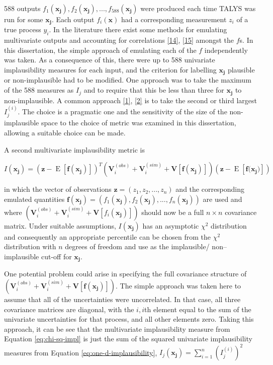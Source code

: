 \documentclass[
  12pt,
  a4paper,
  twoside]{book}
\DeclareMathOperator{\E}{E}
\begin{document}
588 outputs \(f_1(\mathbf{x_j}),f_2(\mathbf{x_j}),...,f_{588}(\mathbf{x_j})\) were produced each time TALYS was run for some \(\mathbf{x_j}\). Each output \(f_i(\mathbf{x})\) had a corresponding measurement \(z_i\) of a true process \(y_i\). In the literature there exist some methods for emulating multivariate outputs and accounting for correlations \protect\hyperlink{ref-jonty_efficient}{{[}14{]}}, \protect\hyperlink{ref-multivariate_gp}{{[}15{]}} amongst the \(f\)s. In this dissertation, the simple approach of emulating each of the \(f\) independently was taken. As a consequence of this, there were up to 588 univariate implausibility measures for each input, and the criterion for labelling \(\mathbf{x_j}\) plausible or non-implausible had to be modified. One approach was to take the maximum of the 588 measures as \(I_j\) and to require that this be less than three for \(\mathbf{x_j}\) to non-implausible. A common approach \protect\hyperlink{ref-jeremy_histmatch}{{[}1{]}}, \protect\hyperlink{ref-bower2010galaxy}{{[}2{]}} is to take the second or third largest \(I^{(i)}_j\). The choice is a pragmatic one and the sensitivity of the size of the non-implausible space to the choice of metric was examined in this dissertation, allowing a suitable choice can be made.

A second multivariate implausibility metric is

\begin{equation}
\label{eq:chi-sq-impl}
I(\mathbf{x_j}) = (\mathbf{z} - \E[\mathbf{f(x_j)}])^T\left(\mathbf{V}_i^{(obs)} + \mathbf{V}_i^{(sim)} + \mathbf{V}[\mathbf{f(x_j)}]\right)(\mathbf{z} - \E[\mathbf{f(x_j})])
\end{equation}

in which the vector of observations \(\mathbf{z} = (z_1,z_2,...,z_n)\) and the corresponding emulated quantities \(\mathbf{f(x_j)} = (f_1(\mathbf{x_j}),f_2(\mathbf{x_j}),...,f_n(\mathbf{x_j}))\) are used and where \(\left(\mathbf{V}_i^{(obs)} + \mathbf{V}_i^{(sim)} + \mathbf{V}[f_i(\mathbf{x_j})]\right)\) should now be a full \(n \times n\) covariance matrix. Under suitable assumptions, \(I(\mathbf{x_j})\) has an asymptotic \(\chi^2\) distribution and consequently an appropriate percentile can be chosen from the \(\chi^2\) distribution with \(n\) degrees of freedom and use as the implausible/ non--implausible cut-off for \(\mathbf{x_j}\).

One potential problem could arise in specifying the full covariance structure of \(\left(\mathbf{V}_i^{(obs)} + \mathbf{V}_i^{(sim)} + \mathbf{V}[\mathbf{f(x_j)}]\right)\). The simple approach was taken here to assume that all of the uncertainties were uncorrelated. In that case, all three covariance matrices are diagonal, with the \(i,i\)th element equal to the sum of the univariate uncertainties for that process, and all other elements zero. Taking this approach, it can be see that the multivariate implausibility measure from Equation \eqref{eq:chi-sq-impl} is just the sum of the squared univariate implausibility measures from Equation \eqref{eq:one-d-implausibility}, \(I_j(\mathbf{x_j}) = \sum_{i=1}^n \left(I_j^{(i)}\right)^2\)
\end{document}
